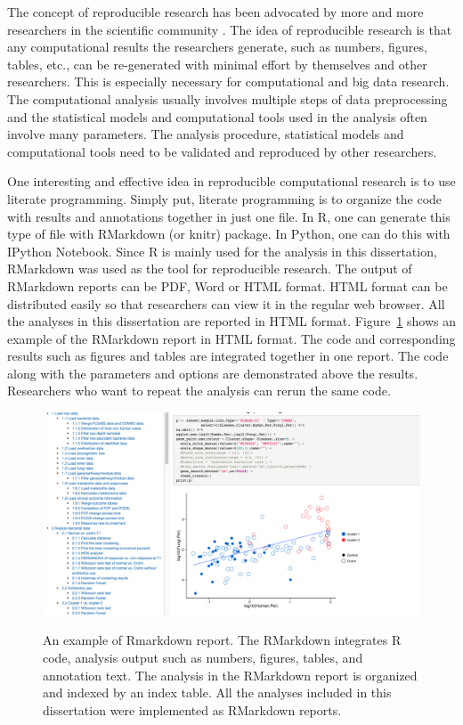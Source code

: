 \label{chpt:repro}

The concept of reproducible research has been  advocated by more and more researchers in the scientific community \citep{Peng:2011et, Sandve:2013gh}. The idea of reproducible research is that any computational results the researchers generate, such as numbers, figures, tables, etc., can be re-generated with minimal effort by themselves and other researchers. This is especially necessary for computational and big data research. The computational analysis usually involves  multiple steps of data preprocessing and the statistical models and computational tools used in the analysis often involve many parameters.   The analysis procedure, statistical models and computational tools need to be validated and reproduced by other researchers. 

One interesting and effective  idea in reproducible computational research is to use literate programming. Simply put, literate programming is to organize the code with results and annotations together in just one file. In R, one can generate this type of file with RMarkdown (or knitr) package. In Python, one can do this with IPython Notebook. Since R is mainly used for the analysis in this dissertation,  RMarkdown was used as the tool for reproducible research. The output of RMarkdown reports can be PDF, Word or HTML format. HTML format can be distributed easily so that researchers can view it in the regular web browser.  All the analyses  in this dissertation are reported in HTML format. Figure~\ref{F61_Reproducible_Research} shows an example of the RMarkdown report in HTML format. The code and corresponding results such as figures and tables are integrated together in one report. The code along with the parameters and options are demonstrated above the results. Researchers who want to repeat the analysis can rerun the same code.



\begin{figure}[p]
	\centering
	{\includegraphics[scale=0.4,trim=0 0 0 0,clip]{Figure/F61_Reproducible_Research.pdf}}
	\caption[An example of RMarkdown report]{An example of Rmarkdown report. The RMarkdown integrates R code, analysis output such as numbers, figures, tables, and annotation text. The analysis in the RMarkdown report is organized and indexed by an index table.  All the analyses included in this dissertation were implemented as RMarkdown reports.
	}
	\label{F61_Reproducible_Research}
\end{figure}



